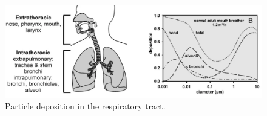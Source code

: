 \documentclass[
  letterpaper,
  DIV=11,
  numbers=noendperiod,
  oneside]{scrartcl}
\begin{document}
\begin{figure}

{\centering \includegraphics{12989_2009_Article_100_Fig6_HTML.webp}

}

\caption{\label{fig-deposition}Particle deposition in the respiratory
tract.}

\end{figure}
\end{document}
